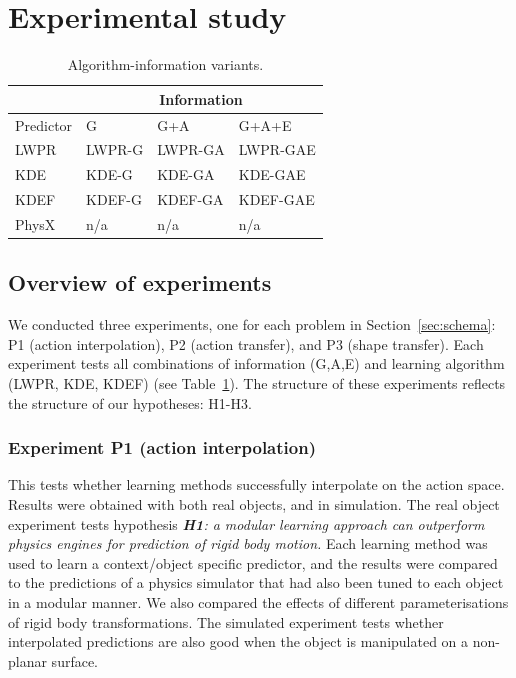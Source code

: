 
\newlength{\barchartwidth}
\setlength{\barchartwidth}{6.5cm}

\section{Experimental study}\label{sec:Experiment}

\begin{table}[t]
\begin{center}
\begin{tabular}{|l|l|l|l|}\hline
 & \multicolumn{3}{|c|}{Information} \\ \hline
Predictor & G & G+A & G+A+E \\ \hline
LWPR & LWPR-G& LWPR-GA & LWPR-GAE \\ \hline
KDE & KDE-G & KDE-GA & KDE-GAE \\ \hline
KDEF & KDEF-G & KDEF-GA & KDEF-GAE \\ \hline
PhysX & n/a & n/a & n/a \\ \hline
\end{tabular}
\caption{Algorithm-information variants. \label{tab:algs}}
\end{center}
\end{table}

\subsection{Overview of experiments}\label{sec:Experiment.Overview}

We conducted three experiments, one for each problem in Section~\ref{sec:schema}: P1 (action interpolation), P2 (action transfer), and P3
(shape transfer). Each experiment tests all combinations of information (G,A,E) and learning algorithm (LWPR, KDE, KDEF) (see Table~\ref{tab:algs}). The structure of these experiments reflects the structure of our hypotheses: H1-H3.

\subsubsection{Experiment P1 (action interpolation)} This tests whether learning methods successfully interpolate on the action space. Results were obtained with both real objects, and in simulation. The  real object experiment tests hypothesis {\em {\bf H1}: a modular learning approach can outperform physics engines for prediction of rigid body motion.} Each learning method was used to learn a context/object specific predictor, and the results were compared to the predictions of a physics simulator that had also been tuned to each object in a modular manner. We also compared the effects of different parameterisations of rigid body transformations. The simulated experiment tests whether interpolated predictions are also good when the object is manipulated on a non-planar surface. 

